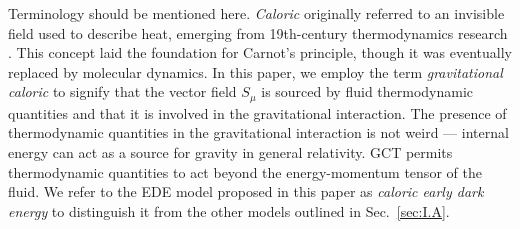 \documentclass[aps,prd,twocolumn]{revtex4-2}
\begin{document}
Terminology should be mentioned here. \textit{Caloric} originally referred to an invisible field used to describe heat, emerging from 19th-century thermodynamics research \cite{Callendar1910.ProcPhysSocLondon.23.153}. This concept laid the foundation for Carnot's principle, though it was eventually replaced by molecular dynamics. In this paper, we employ the term \textit{gravitational caloric} to signify that the vector field $S_\mu$ is sourced by fluid thermodynamic quantities and that it is involved in the gravitational interaction. The presence of thermodynamic quantities in the gravitational interaction is not weird --- internal energy can act as a source for gravity in general relativity. GCT permits thermodynamic quantities to act beyond the energy-momentum tensor of the fluid. We refer to the EDE model proposed in this paper as \textit{caloric early dark energy} to distinguish it from the other models outlined in Sec.~\ref{sec:I.A}.
\end{document}
